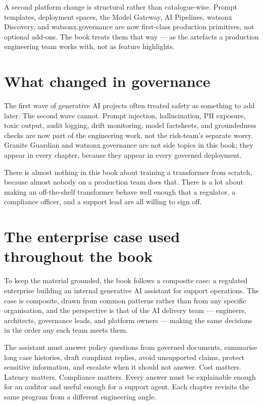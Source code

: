 A second platform change is structural rather than catalogue-wise. Prompt templates, deployment spaces, the Model Gateway, AI Pipelines, watsonx Discovery, and watsonx.governance are now first-class production primitives, not optional add-ons. The book treats them that way --- as the artefacts a production engineering team works with, not as feature highlights.

\section*{What changed in governance}

The first wave of generative AI projects often treated safety as something to add later. The second wave cannot. Prompt injection, hallucination, PII exposure, toxic output, audit logging, drift monitoring, model factsheets, and groundedness checks are now part of the engineering work, not the risk-team's separate worry. Granite Guardian and watsonx.governance are not side topics in this book; they appear in every chapter, because they appear in every governed deployment.

There is almost nothing in this book about training a transformer from scratch, because almost nobody on a production team does that. There is a lot about making an off-the-shelf transformer behave well enough that a regulator, a compliance officer, and a support lead are all willing to sign off.

\section*{The enterprise case used throughout the book}

To keep the material grounded, the book follows a composite case: a regulated enterprise building an internal generative AI assistant for support operations. The case is composite, drawn from common patterns rather than from any specific organisation, and the perspective is that of the AI delivery team --- engineers, architects, governance leads, and platform owners --- making the same decisions in the order any such team meets them.

The assistant must answer policy questions from governed documents, summarise long case histories, draft compliant replies, avoid unsupported claims, protect sensitive information, and escalate when it should not answer. Cost matters. Latency matters. Compliance matters. Every answer must be explainable enough for an auditor and useful enough for a support agent. Each chapter revisits the same program from a different engineering angle.

